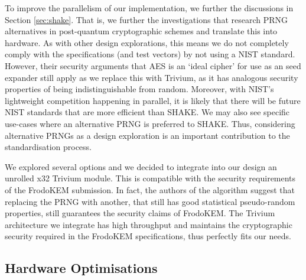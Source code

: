 To improve the parallelism of our implementation, we further the discussions in Section \ref{sec:shake}. That is, we further the investigations that research PRNG alternatives in post-quantum cryptographic schemes and translate this into hardware. As with other design explorations, this means we do not completely comply with the specifications (and test vectors) by not using a NIST standard. However, their security arguments that AES is an `ideal cipher' for use as an seed expander still apply as we replace this with Trivium, as it has analogous security properties of being indistinguishable from random. Moreover, with NIST's lightweight competition happening in parallel, it is likely that there will be future NIST standards that are more efficient than SHAKE. We may also see specific use-cases where an alternative PRNG is preferred to SHAKE. Thus, considering alternative PRNGs as a design exploration is an important contribution to the standardisation process.

We explored several options and we decided to integrate into our design an unrolled x32 Trivium \cite{de2008trivium} module. This is compatible with the security requirements of the FrodoKEM submission. In fact, the authors of the algorithm suggest that replacing the PRNG with another, that still has good statistical pseudo-random properties, still guarantees the security claims of FrodoKEM. The Trivium architecture we integrate has high throughput and maintains the cryptographic security required in the FrodoKEM specifications, thus perfectly fits our needs. %

\subsection{Hardware Optimisations}

